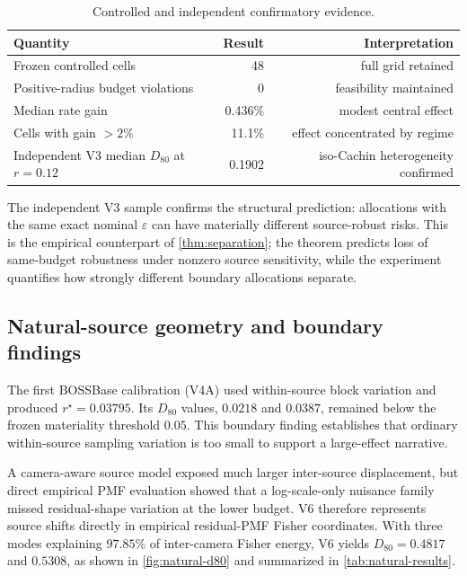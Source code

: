 \documentclass[10pt]{article}
\begin{document}
\begin{table}[t]
\centering
\caption{Controlled and independent confirmatory evidence.}
\label{tab:grid-summary}
\small
\begin{tabular}{@{}lrr@{}}
\toprule
Quantity & Result & Interpretation\\
\midrule
Frozen controlled cells & 48 & full grid retained\\
Positive-radius budget violations & 0 & feasibility maintained\\
Median rate gain & 0.436\% & modest central effect\\
Cells with gain \(>2\%\) & 11.1\% & effect concentrated by regime\\
Independent V3 median \(D_{80}\) at \(r=0.12\) & 0.1902 & iso-Cachin heterogeneity confirmed\\
\bottomrule
\end{tabular}
\end{table}

The independent V3 sample confirms the structural prediction: allocations with the same exact nominal \(\varepsilon\) can have materially different source-robust risks. This is the empirical counterpart of \cref{thm:separation}; the theorem predicts loss of same-budget robustness under nonzero source sensitivity, while the experiment quantifies how strongly different boundary allocations separate.

\subsection{Natural-source geometry and boundary findings}
The first BOSSBase calibration (V4A) used within-source block variation and produced \(r^\star=0.03795\). Its \(D_{80}\) values, \(0.0218\) and \(0.0387\), remained below the frozen materiality threshold \(0.05\). This boundary finding establishes that ordinary within-source sampling variation is too small to support a large-effect narrative.

A camera-aware source model exposed much larger inter-source displacement, but direct empirical PMF evaluation showed that a log-scale-only nuisance family missed residual-shape variation at the lower budget. V6 therefore represents source shifts directly in empirical residual-PMF Fisher coordinates. With three modes explaining \(97.85\%\) of inter-camera Fisher energy, V6 yields \(D_{80}=0.4817\) and \(0.5308\), as shown in \cref{fig:natural-d80} and summarized in \cref{tab:natural-results}.
\end{document}

